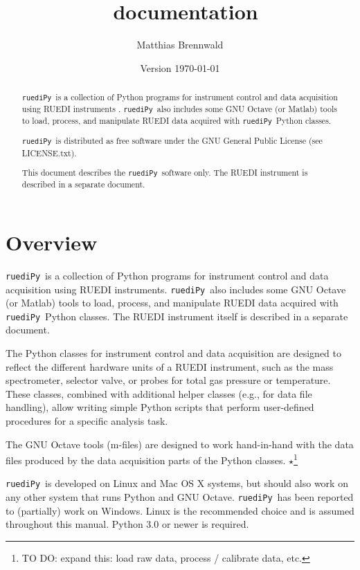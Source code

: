 \documentclass[12pt]{article}   	%
\title{\ruediPy\ documentation}
\author{Matthias Brennwald}
\date{Version \today}							%
\newcommand{\ruediPy}{\texttt{ruediPy}}
\newcommand{\work}[1]{{\Large\bf\ensuremath{\star}}\footnote{TO DO: #1}}
\begin{document}
\maketitle

\begin{abstract}
\ruediPy\ is a collection of Python programs for instrument control and data acquisition using RUEDI instruments \citep{Brennwald:2016a}. \ruediPy\ also includes some GNU Octave (or Matlab) tools to load, process, and manipulate RUEDI data acquired with \ruediPy\ Python classes.\par

\ruediPy\ is distributed as free software under the GNU General Public License (see LICENSE.txt).

This document describes the \ruediPy\ software only. The RUEDI instrument is described in a separate document\citep{Brennwald:2016a}.


\end{abstract}

\tableofcontents

\clearpage

\section{Overview}
\ruediPy\ is a collection of Python programs for instrument control and data acquisition using RUEDI instruments. \ruediPy\ also includes some GNU Octave (or Matlab) tools to load, process, and manipulate RUEDI data acquired with \ruediPy\ Python classes. The RUEDI instrument itself is described in a separate document\citep{Brennwald:2016a}.\par

The Python classes for instrument control and data acquisition are designed to reflect the different hardware units of a RUEDI instrument, such as the mass spectrometer, selector valve, or probes for total gas pressure or temperature. These classes, combined with additional helper classes (e.g., for data file handling), allow writing simple Python scripts that perform user-defined procedures for a specific analysis task.\par

The GNU Octave tools (m-files) are designed to work hand-in-hand with the data files produced by the data acquisition parts of the Python classes. \work{expand this: load raw data, process / calibrate data, etc.}

\ruediPy\ is developed on Linux and Mac OS X systems, but should also work on any other system that runs Python and GNU Octave. \ruediPy\ has been reported to (partially) work on Windows. Linux is the recommended choice and is assumed throughout this manual. Python 3.0 or newer is required.\par
\end{document}
